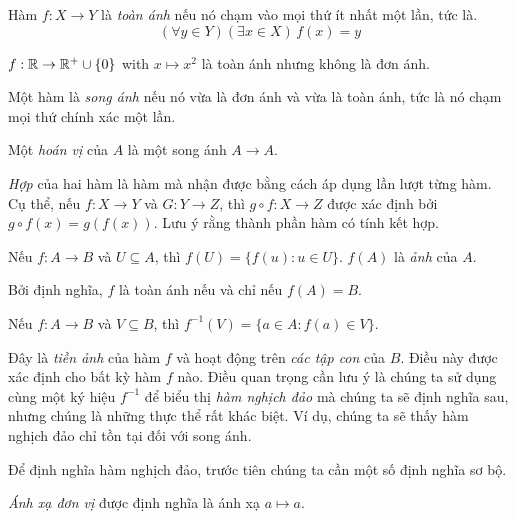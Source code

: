 \begin{defi}
  Hàm $f: X \to Y$ là \emph{toàn ánh} nếu nó chạm vào mọi thứ ít nhất một lần, tức là.
  \[
    (\forall y\in Y)(\exists x\in X)\,f(x) = y
  \]
\end{defi}

\begin{eg}
  $f: \mathbb{R} \to\mathbb{R}^+\cup\{0\}$ with $x \mapsto x^2$ là toàn ánh nhưng không là đơn ánh.
\end{eg}

\begin{defi}
  Một hàm là \emph{song ánh} nếu nó vừa là đơn ánh và vừa là toàn ánh, tức là nó chạm mọi thứ chính xác một lần.
\end{defi}

\begin{defi}[Hoán vị]
  Một \emph{hoán vị} của $A$ là một song ánh $A\to A$.
\end{defi}

\begin{defi}
  \emph{Hợp} của hai hàm là hàm mà nhận được bằng cách áp dụng lần lượt từng hàm. Cụ thể, nếu $f: X \rightarrow Y$ và $G: Y\rightarrow Z$, thì $g\circ f: X \rightarrow Z$ được xác định bởi $g\circ f(x) = g(f( x))$. Lưu ý rằng thành phần hàm có tính kết hợp.
\end{defi}

\begin{defi}
  Nếu $f: A\to B$ và $U\subseteq A$, thì $f(U) = \{f(u):u\in U\}$. $f(A)$ là \emph{ảnh} của $A$.
\end{defi}
Bởi định nghĩa, $f$ là toàn ánh nếu và chỉ nếu $f(A) = B$.

\begin{defi}
  Nếu $f: A\to B$ và $V\subseteq B$, thì $f^{-1}(V) = \{a\in A: f(a)\in V\}$.
\end{defi}
Đây là \emph{tiền ảnh} của hàm $f$ và hoạt động trên \emph{các tập con} của $B$. Điều này được xác định cho bất kỳ hàm $f$ nào. Điều quan trọng cần lưu ý là chúng ta sử dụng cùng một ký hiệu $f^{-1}$ để biểu thị \emph{hàm nghịch đảo} mà chúng ta sẽ định nghĩa sau, nhưng chúng là những thực thể rất khác biệt. Ví dụ, chúng ta sẽ thấy hàm nghịch đảo chỉ tồn tại đối với song ánh.

Để định nghĩa hàm nghịch đảo, trước tiên chúng ta cần một số định nghĩa sơ bộ.

\begin{defi}
  \emph{Ánh xạ đơn vị} được định nghĩa là ánh xạ $a\mapsto a$.
\end{defi}


